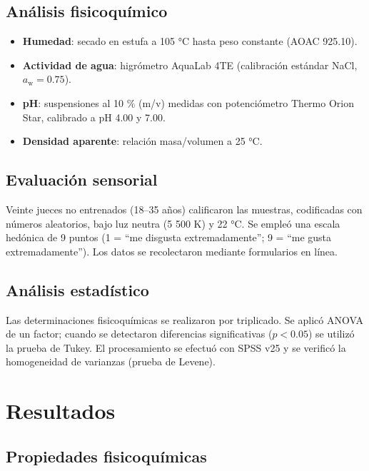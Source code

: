 \documentclass[manuscript,screen,review]{acmart}
\begin{document}
     \subsection{Análisis fisicoquímico}
    \begin{itemize}
      \item \textbf{Humedad}: secado en estufa a 105 °C hasta peso constante (AOAC 925.10).  
      \item \textbf{Actividad de agua}: higrómetro AquaLab 4TE (calibración estándar NaCl, \(a_\text{w}=0.75\)).  
      \item \textbf{pH}: suspensiones al 10 \% (m/v) medidas con potenciómetro Thermo Orion Star, calibrado a pH 4.00 y 7.00.  
      \item \textbf{Densidad aparente}: relación masa/volumen a 25 °C.  
    \end{itemize}
    
    \subsection{Evaluación sensorial}
    Veinte jueces no entrenados (18–35 años) calificaron las muestras, codificadas con números aleatorios, bajo luz neutra (5 500 K) y 22 °C. Se empleó una escala hedónica de 9 puntos (1 = ``me disgusta extremadamente''; 9 = ``me gusta extremadamente''). Los datos se recolectaron mediante formularios en línea.
    
    \subsection{Análisis estadístico}
    Las determinaciones fisicoquímicas se realizaron por triplicado. Se aplicó ANOVA de un factor; cuando se detectaron diferencias significativas (\(p<0.05\)) se utilizó la prueba de Tukey. El procesamiento se efectuó con SPSS v25 y se verificó la homogeneidad de varianzas (prueba de Levene).



\section{Resultados}

\subsection{Propiedades fisicoquímicas}
\end{document}
